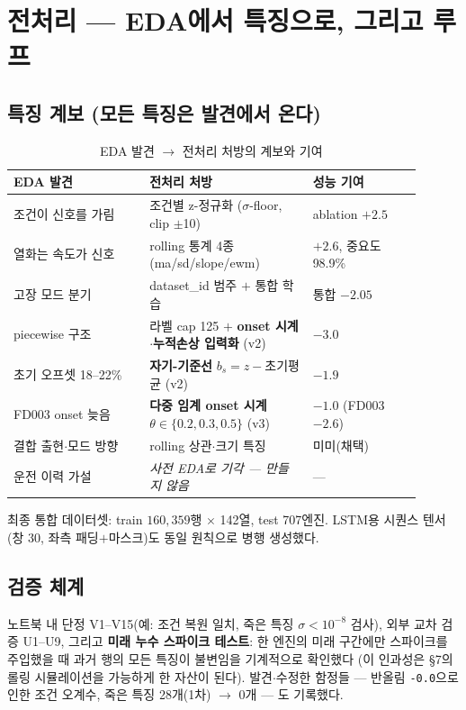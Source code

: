 \documentclass[11pt]{article}
\begin{document}
\section{전처리 — EDA에서 특징으로, 그리고 루프}

\subsection{특징 계보 (모든 특징은 발견에서 온다)}

\begin{table}[H]
\centering\small
\caption{EDA 발견 $\to$ 전처리 처방의 계보와 기여}
\begin{tabular}{p{0.3\linewidth}p{0.36\linewidth}p{0.24\linewidth}}
\toprule
EDA 발견 & 전처리 처방 & 성능 기여 \\
\midrule
조건이 신호를 가림 & 조건별 z-정규화 ($\sigma$-floor, clip $\pm$10) & ablation $+2.5$ \\
열화는 속도가 신호 & rolling 통계 4종 (ma/sd/slope/ewm) & $+2.6$, 중요도 98.9\% \\
고장 모드 분기 & dataset\_id 범주 $+$ 통합 학습 & 통합 $-2.05$ \\
piecewise 구조 & 라벨 cap 125 $+$ \textbf{onset 시계$\cdot$누적손상 입력화} (v2) & $-3.0$ \\
초기 오프셋 18--22\% & \textbf{자기-기준선} $b_s{=}z{-}$초기평균 (v2) & $-1.9$ \\
FD003 onset 늦음 & \textbf{다중 임계 onset 시계} $\theta{\in}\{0.2,0.3,0.5\}$ (v3) & $-1.0$ (FD003 $-2.6$) \\
결합 출현$\cdot$모드 방향 & rolling 상관$\cdot$크기 특징 & 미미(채택) \\
운전 이력 가설 & \emph{사전 EDA로 기각 — 만들지 않음} & — \\
\bottomrule
\end{tabular}
\end{table}

최종 통합 데이터셋: train $160{,}359$행 $\times$ 142열, test 707엔진.
LSTM용 시퀀스 텐서(창 30, 좌측 패딩$+$마스크)도 동일 원칙으로 병행 생성했다.

\subsection{검증 체계}

노트북 내 단정 V1--V15(예: 조건 복원 일치, 죽은 특징 $\sigma{<}10^{-8}$ 검사),
외부 교차 검증 U1--U9, 그리고 \textbf{미래 누수 스파이크 테스트}:
한 엔진의 미래 구간에만 스파이크를 주입했을 때 과거 행의 모든 특징이 불변임을 기계적으로 확인했다
(이 인과성은 \S7의 롤링 시뮬레이션을 가능하게 한 자산이 된다).
발견$\cdot$수정한 함정들 — 반올림 \texttt{-0.0}으로 인한 조건 오계수, 죽은 특징 28개(1차) $\to$ 0개 — 도 기록했다.
\end{document}
